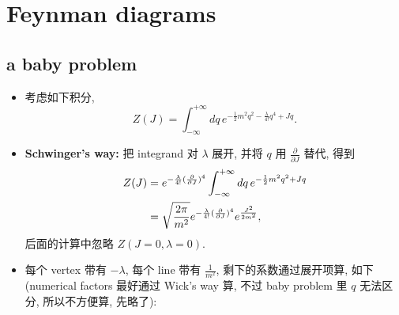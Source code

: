 \chapter{Feynman diagrams}
\section{a baby problem}
\begin{itemize}
	\item 考虑如下积分,
	\begin{equation} \label{Feynman diagrams.1.1}
		Z(J) = \int_{- \infty}^{+ \infty} dq \, e^{- \frac{1}{2} m^2 q^2 - \frac{\lambda}{4!} q^4 + J q}.
	\end{equation}
	
	\item \textbf{Schwinger's way:} 把 integrand 对 $\lambda$ 展开, 并将 $q$ 用 $\frac{\partial}{\partial J}$ 替代, 得到
	\begin{align}
		Z(J) &= e^{- \frac{\lambda}{4!} (\frac{\partial}{\partial J})^4} \int_{- \infty}^{+ \infty} dq \, e^{- \frac{1}{2} m^2 q^2 + J q} \notag \\
		&= \sqrt{\frac{2 \pi}{m^2}} e^{- \frac{\lambda}{4!} (\frac{\partial}{\partial J})^4} e^{\frac{J^2}{2 m^2}}, \label{Feynman diagrams.1.2}
	\end{align}
	后面的计算中忽略 $Z(J = 0, \lambda = 0)$.
	
	\item 每个 vertex 带有 $- \lambda$, 每个 line 带有 $\frac{1}{m^2}$, 剩下的系数通过展开项算, 如下 (numerical factors 最好通过 Wick's way 算, 不过 baby problem 里 $q$ 无法区分, 所以不方便算, 先略了):
	

\end{itemize}
